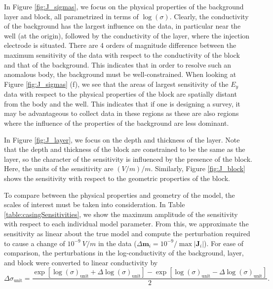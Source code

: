 In Figure \ref{fig:J_sigmas}, we focus on the physical properties of the
background layer and block, all parametrized in terms of $\log(\sigma)$.
Clearly, the conductivity of the background has the largest influence on the
data, in particular near the well (at the origin), followed by the
conductivity of the layer, where the injection electrode is situated. There
are 4 orders of magnitude difference between the maximum sensitivity of the data with
respect to the conductivity of the block and that of the background. This
indicates that in order to resolve such an anomalous body, the background
must be well-constrained. When looking at Figure \ref{fig:J_sigmas} (f), we
see that the areas of largest sensitivity of the $E_y$ data with respect to the
physical properties of the block are spatially distant from the body and the
well. This  indicates that if one is designing a survey, it may be advantageous to
collect data in these regions as these are also regions where the influence of the properties
of the background are less dominant.

In Figure \ref{fig:J_layer}, we focus on the depth and thickness of the layer.
Note that the depth and thickness of the block are constrained to be the same
as the layer, so the character of the sensitivity is influenced by the
presence of the block. Here, the units of the sensitivity are $(V/m) / m$.
Similarly, Figure \ref{fig:J_block} shows the sensitivity with respect to the
geometric properties of the block.

To compare between the physical properties and geometry of the model, the
scales of interest must be taken into consideration. In Table
\ref{table:casingSensitivities}, we show the maximum amplitude of the
sensitivity with respect to each individual model parameter. From this, we
approximate the sensitivity as linear about the true model and compute the
perturbation required to cause a change of $10^{-9}~V/m$ in the data
($\Delta \mathbf{m}_i = 10^{-9} / \max|\mathbf{J}_i|$). For ease
of comparison, the perturbations in the log-conductivity of the background,
layer, and block were converted to linear conductivity by
\begin{equation}
    \Delta \sigma_{\text{unit}} = \frac{\exp[\log(\sigma)_\text{unit} + \Delta\log(\sigma)_\text{unit}] -
                                        \exp[\log(\sigma)_\text{unit} - \Delta\log(\sigma)_\text{unit}]}{2}.
\label{eq:log2linear}
\end{equation}

